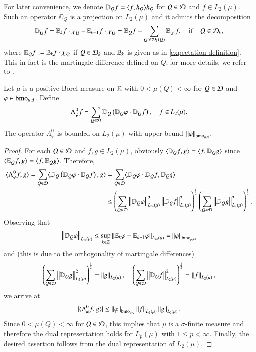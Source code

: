 \documentclass[leqno]{amsart}
\begin{document}
For later convenience, we denote $\mathbb{D}_{Q}f=\langle f,h_{Q} \rangle h_{Q}$ for $Q\in{\mathcal D}$ and $f\in L_{2}(\mu)$. Such an operator $\DD_{Q}$ is a projection on $L_{2}(\mu)$ and it admits the decomposition
\begin{align*}
\mathbb{D}_{Q}f=\mathbb E_{k}f\cdot\chi_{Q}-\mathbb E_{k-1}f\cdot\chi_{Q}
=\mathbb E_{Q}f-\sum_{Q'\in{\mathcal D}_{1}(Q)}\mathbb E_{Q'}f
,\quad\mbox{if}\quad Q\in{\mathcal D}_{k},
\end{align*}
where $\mathbb E_{Q}f:=\mathbb E_{k}f\cdot\chi_{Q}$ if $Q\in{\mathcal D}_{k}$ and $\mathbb E_{k}$ is given as in \eqref{expectation definition}. This in fact is the martingale difference defined on $Q$; for more details, we refer to \cite[Section 5.3]{LMP2014}.


\begin{lemma}\label{L2 estimate ad-paraproduct}
Let $\mu$ is a positive Borel measure on ${\mathbb R}$ with $0<\mu(Q)<\infty$ for $Q\in{\mathcal D}$ and $\varphi\in{\rm bmo}_{\mu,\mathsf{d}}$. Define
\begin{align*}
\Lambda^{0}_{\varphi}f=\sum_{Q\in{\mathcal D}}\mathbb{D}_{Q}\left(\mathbb{D}_{Q}\varphi\cdot\mathbb{D}_{Q}f\right),
\quad f\in L_{2}(\mu).
\end{align*}
The operator $\Lambda^{0}_{\varphi}$ is bounded on $L_{2}(\mu)$ with upper bound $\left\| \varphi \right\|_{{\rm bmo}_{\mu,\mathsf{d}}}$.
\end{lemma}
\begin{proof}
For each $Q\in{\mathcal D}$ and $f,g\in L_{2}(\mu)$, obviously $\langle \mathbb{D}_{Q}f,g \rangle=\langle f,\mathbb{D}_{Q}g \rangle$ since $\langle \mathbb E_{Q}f,g \rangle=\langle f,\mathbb E_{Q}g \rangle$. Therefore, 
\begin{align*}
\langle \Lambda^{0}_{\varphi}f,g \rangle
=\sum_{Q\in{\mathcal D}}\langle \mathbb{D}_{Q}\left(\mathbb{D}_{Q}\varphi\cdot\mathbb{D}_{Q}f\right),g \rangle
&=\sum_{Q\in{\mathcal D}}\langle \mathbb{D}_{Q}\varphi\cdot\mathbb{D}_{Q}f,\mathbb{D}_{Q}g \rangle\\
&\leq\left(\sum_{Q\in{\mathcal D}}\left\| \mathbb{D}_{Q}\varphi \right\|_{L_{\infty}(\mu)}^{2}\left\| \mathbb{D}_{Q}f \right\|_{L_{2}(\mu)}^{2}\right)^{\frac{1}{2}}
\left(\sum_{Q\in{\mathcal D}}\left\| \mathbb{D}_{Q}g \right\|_{L_{2}(\mu)}^{2}\right)^{\frac{1}{2}}.
\end{align*}
Observing that
\begin{align*}
\left\| \mathbb{D}_{Q}\varphi \right\|_{L_{\infty}(\mu)}
\leq\sup_{k\in{\mathbb Z}}\left\| \mathbb E_{k}\varphi-\mathbb E_{k-1}\varphi \right\|_{L_{\infty}(\mu)}
=\left\| \varphi \right\|_{{\rm bmo}_{\mu,\infty}}
\end{align*}
and (this is due to the orthogonality of martingale differences)
\begin{align*}
\left(\sum_{Q\in{\mathcal D}}\left\| \mathbb{D}_{Q}g \right\|_{L_{2}(\mu)}^{2}\right)^{\frac{1}{2}}=\left\| g \right\|_{L_{2}(\mu)},\quad
\left(\sum_{Q\in{\mathcal D}}\left\| \mathbb{D}_{Q}f \right\|_{L_{2}(\mu)}^{2}\right)^{\frac{1}{2}}=\left\| f \right\|_{L_{2}(\mu)},
\end{align*}
we arrive at
\begin{align*}
|\langle \Lambda^{0}_{\varphi}f,g \rangle|
\leq\left\| \varphi \right\|_{{\rm bmo}_{\mu,\mathsf{d}}}\left\| f \right\|_{L_{2}(\mu)}\left\| g \right\|_{L_{2}(\mu)}.
\end{align*}
Since $0<\mu(Q)<\infty$ for $Q\in{\mathcal D}$, this implies that $\mu$ is a $\sigma$-finite measure and therefore the dual representation holds for $L_{p}(\mu)$ with $1\leq p<\infty$.
Finally, the desired assertion follows from the dual representation of $L_{2}(\mu)$.
\end{proof}
\end{document}
